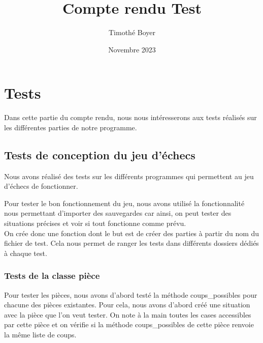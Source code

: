 \documentclass{article}
\title{Compte rendu Test}
\author{Timothé Boyer}
\date{Novembre 2023}
\begin{document}
\maketitle

\section{Tests}
Dans cette partie du compte rendu, nous nous intéresserons aux tests réalisés sur les différentes parties de notre programme.

\subsection{Tests de conception du jeu d'échecs}
Nous avons réalisé des tests sur les différents programmes qui permettent au jeu d'échecs de fonctionner.

Pour tester le bon fonctionnement du jeu, nous avons utilisé la fonctionnalité nous permettant d'importer des sauvegardes car ainsi, on peut tester des situations précises et voir si tout fonctionne comme prévu.
\\
On crée donc une fonction dont le but est de créer des parties à partir du nom du fichier de test. Cela nous permet de ranger les tests dans différents dossiers dédiés à chaque test.

\subsubsection{Tests de la classe pièce}
Pour tester les pièces, nous avons d'abord testé la méthode coups\_possibles pour chacune des pièces existantes. Pour cela, nous avons d'abord créé une situation avec la pièce que l'on veut tester. On note à la main toutes les cases accessibles par cette pièce et on vérifie si la méthode coups\_possibles de cette pièce renvoie la même liste de coups.
\end{document}
